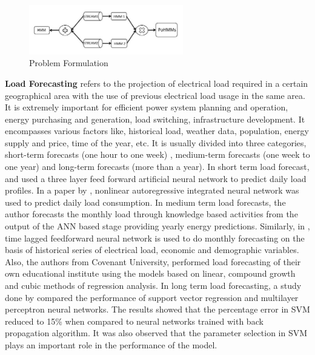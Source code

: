 \documentclass{acm_proc_article-sp}
\begin{document}
\begin{figure}[th]
\centering
\includegraphics[width=0.6\textwidth,height=0.12\textheight]{chart.jpg}
\caption{Problem Formulation}
\label{fig:problem}
\end{figure}

\noindent \textbf{Load Forecasting} refers to the projection of electrical load required in a certain geographical area with the use of previous electrical load usage in the same area. It is extremely important for efficient power system planning and operation, energy purchasing and generation, load switching, infrastructure development. It encompasses various factors like, historical load, weather data, population, energy supply and price, time of the year, etc.
It is usually divided into three categories, short-term forecasts (one hour to one week) , medium-term forecasts (one week to one year) and long-term forecasts (more than a year).
In short term load forecast, \cite{Bakirtzis} and \cite{Chen} used a three layer feed forward artificial neural network to predict daily load profiles. In a paper by \cite{Chow}, nonlinear autoregressive integrated neural network was used to predict daily load consumption.
In medium term load forecasts, the author forecasts \cite{Falvo} the monthly load through knowledge based activities from the output of the ANN based stage providing yearly energy predictions. Similarly, in \cite{bassi}, time lagged feedforward neural network is used to do monthly forecasting on the basis of historical series of electrical load, economic and demographic variables. Also, the authors from Covenant University, \cite{samuel} performed load forecasting of their own educational institute using the models based on linear, compound growth and cubic methods of regression analysis.
In long term load forecasting, a study done by \cite{achnata2012long} compared the performance of support vector regression and multilayer perceptron neural networks. The results showed that the percentage error in SVM reduced to 15\% when compared to neural networks trained with back propagation algorithm. It was also observed that the parameter selection in SVM plays an important role in the performance of the model.
\end{document}
